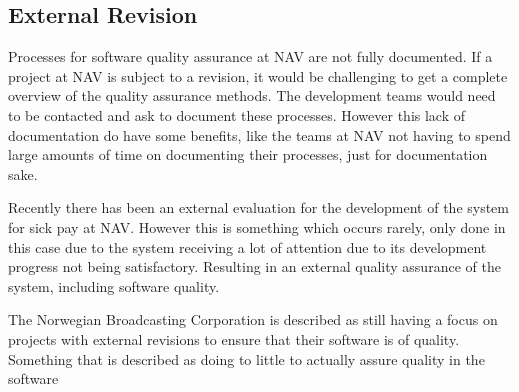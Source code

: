 



\subsection{External Revision}
Processes for software quality assurance at NAV are not fully documented. If a project at NAV is subject to a revision, it would be challenging to get a complete overview of the quality assurance methods. The development teams would need to be contacted and ask to document these processes. However this lack of documentation do have some benefits, like the teams at NAV not having to spend large amounts of time on documenting their processes, just for documentation sake.

Recently there has been an external evaluation for the development of the system for sick pay at NAV. However this is something which occurs rarely, only done in this case due to the system receiving a lot of attention due to its development progress not being satisfactory. Resulting in an external quality assurance of the system, including software quality.

The Norwegian Broadcasting Corporation is described as still having a focus on projects with external revisions to ensure that their software is of quality. Something that is described as doing to little to actually assure quality in the software

